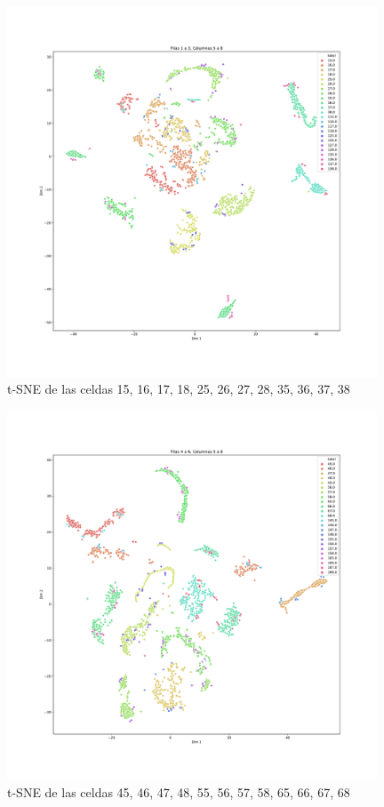 \begin{figure}[H]
    \centering
    \includegraphics[width=110mm, angle=0]{4/Fotos/tsne_TimeGAN_13-58.pdf}
    \captionsetup{justification=centering,margin=1.25cm}
    \caption{t-SNE de las celdas 15, 16, 17, 18, 25, 26, 27, 28, 35, 36, 37, 38}
    \label{fig:13-58}
\end{figure}

\begin{figure}[H]
    \centering
    \includegraphics[width=110mm, angle=0]{4/Fotos/tsne_TimeGAN_46-58.pdf}
    \captionsetup{justification=centering,margin=1.25cm}
    \caption{t-SNE de las celdas 45, 46, 47, 48, 55, 56, 57, 58, 65, 66, 67, 68}
    \label{fig:46-58}
\end{figure}

